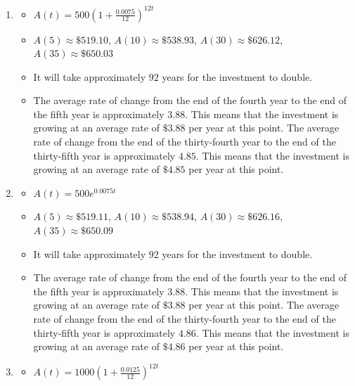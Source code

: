 \begin{enumerate}

\item \begin{itemize}  \item $A(t) = 500\left(1 + \frac{0.0075}{12}\right)^{12t}$ 

\item $A(5) \approx \$ 519.10$, $A(10) \approx \$ 538.93$, $A(30) \approx \$ 626.12$, $A(35) \approx \$ 650.03$ 

\item It will take approximately $92$ years for the investment to double.

\item  The average rate of change from the end of the fourth year to the end of the fifth year is approximately $3.88$.  This means that the investment is growing at an average rate of $\$3.88$ per year at this point.  The average rate of change from the end of the thirty-fourth year to the end of the thirty-fifth year is approximately $4.85$.  This means that the investment is growing at an average rate of $\$4.85$ per year at this point. 

\end{itemize}

\item \begin{itemize}  \item $A(t) = 500e^{0.0075t}$ 

\item $A(5) \approx \$ 519.11$, $A(10) \approx \$ 538.94$, $A(30) \approx \$ 626.16$, $A(35) \approx \$ 650.09$ 

\item It will take approximately $92$ years for the investment to double.

\item  The average rate of change from the end of the fourth year to the end of the fifth year is approximately $3.88$.  This means that the investment is growing at an average rate of $\$3.88$ per year at this point.  The average rate of change from the end of the thirty-fourth year to the end of the thirty-fifth year is approximately $4.86$.  This means that the investment is growing at an average rate of $\$4.86$ per year at this point. 

\end{itemize}

\item \begin{itemize}  \item $A(t) = 1000\left(1 + \frac{0.0125}{12}\right)^{12t}$ 


\end{itemize}
\end{enumerate}
